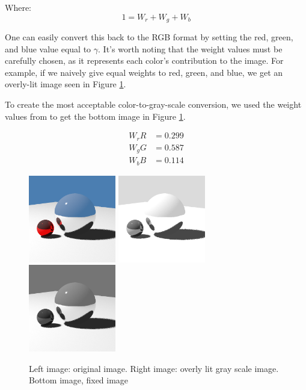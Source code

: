\documentclass{acmsiggraph}
\begin{document}
Where:
\begin{equation}
1 = W_{r} + W_{g} + W_{b}
\end{equation}

One can easily convert this back to the RGB format by setting the red, green,
and blue value equal to $\gamma$.  It's worth noting that the weight values
must be carefully chosen, as it represents each color's contribution to the
image.  For example, if we naively give equal weights to red, green, and blue,
we get an overly-lit image seen in Figure \ref{gray_scale}.

To create the most acceptable color-to-gray-scale conversion, we used the
weight values from \cite{mw11ASCU} to get the bottom image in Figure
\ref{gray_scale}.

\begin{align}
W_{r}R &= 0.299 \\
W_{g}G &= 0.587 \\
W_{b}B &= 0.114
\end{align}

\begin{figure}[htp]
\centering
\includegraphics[width=1.5in]{original_color}
\includegraphics[width=1.5in]{overly_lit_gray_scale}
\includegraphics[width=1.5in]{normal_gray_scale}
\caption{Left image: original image. Right image: overly lit gray scale image.
Bottom image, fixed image}
\label{gray_scale}
\end{figure}
\end{document}
